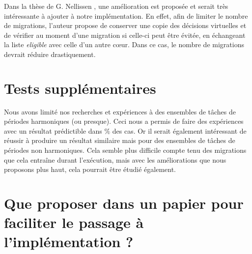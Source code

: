 		Dans la thèse de G. Nellissen \cite{nelissen_geoffrey_efficient_2013}, une amélioration est proposée et serait très intéressante 
		à ajouter à notre implémentation. En effet, afin de limiter le nombre de migrations, l'auteur propose de conserver une 
		copie des décisions \og{}virtuelles\fg{} et de vérifier au moment d'une migration si celle-ci peut être évitée, en 
		échangeant la liste \textit{eligible} avec celle d'un autre cœur. Dans ce cas, le nombre de migrations devrait 
		réduire drastiquement. 
		


\section{Tests supplémentaires}

	Nous avons limité nos recherches et expériences à des ensembles de tâches de périodes harmoniques (ou presque).
	Ceci nous a permis de faire des expériences avec un résultat prédictible dans  $\%$ des cas.
	Or il serait également intéressant de réussir à produire un résultat similaire mais pour des ensembles de tâches 
	de périodes non harmoniques. Cela semble plus difficile compte tenu des migrations que cela entraîne durant l'exécution, 
	mais avec les améliorations que nous proposons plus haut, cela pourrait être étudié également.

\section{Que proposer dans un papier pour faciliter le passage à l'implémentation ?}

